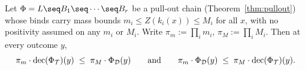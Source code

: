 \begin{theorem}
\label{thm:chain-bound-sandwich}
\leanok
Let $\Phi = L \seq B_1 \seq \cdots \seq B_r$ be a pull-out chain
(Theorem~\ref{thm:pullout}) whose binds carry mass bounds $m_i \le
Z(k_i(x)) \le M_i$ for all $x$, with no positivity assumed on any
$m_i$ or $M_i$. Write $\pi_m := \prod_i m_i$, $\pi_M := \prod_i M_i$.
Then at every outcome $y$,
\[
  \pi_m \cdot \mathrm{dec}(\Phi_{\mathcal T})(y) \;\le\; \pi_M \cdot \Phi_{\mathcal D}(y)
  \qquad\text{and}\qquad
  \pi_m \cdot \Phi_{\mathcal D}(y) \;\le\; \pi_M \cdot \mathrm{dec}(\Phi_{\mathcal T})(y).
\]
\end{theorem}

